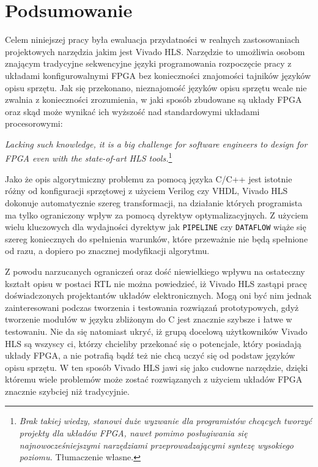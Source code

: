 \chapter*{Podsumowanie}

\pagestyle{empty}
\pagestyle{fancy}
\fancyhead{} %
\fancyhead[RO,LE]{\thepage}

Celem niniejszej pracy była ewaluacja przydatności w realnych zastosowaniach projektowych narzędzia jakim jest Vivado HLS. Narzędzie to umożliwia osobom znającym tradycyjne sekwencyjne języki programowania rozpoczęcie pracy z układami konfigurowalnymi FPGA bez konieczności znajomości tajników języków opisu sprzętu. Jak się przekonano, nieznajomość języków opisu sprzętu wcale nie zwalnia z konieczności zrozumienia, w jaki sposób zbudowane są układy FPGA oraz skąd może wynikać ich wyższość nad standardowymi układami procesorowymi:

\begin{displayquote}
\textit{Lacking such knowledge, it is a big challenge for software engineers to design for FPGA even with the state-of-art HLS tools.}\footnote{\textit{Brak takiej wiedzy, stanowi duże wyzwanie dla programistów chcących tworzyć projekty dla układów FPGA, nawet pomimo posługiwania się najnowocześniejszymi narzędziami przeprowadzającymi syntezę wysokiego poziomu.} Tłumaczenie własne.}\cite{FPGA_SD}
\end{displayquote}

Jako że opis algorytmiczny problemu za pomocą języka C/C++ jest istotnie różny od konfiguracji sprzętowej z użyciem Verilog czy VHDL, Vivado HLS dokonuje automatycznie szereg transformacji, na działanie których programista ma tylko ograniczony wpływ za pomocą dyrektyw optymalizacyjnych. Z użyciem wielu kluczowych dla wydajności dyrektyw jak \texttt{PIPELINE} czy \texttt{DATAFLOW} wiąże się szereg koniecznych do spełnienia warunków, które przeważnie nie będą spełnione od razu, a dopiero po znacznej modyfikacji algorytmu. 

Z powodu narzucanych ograniczeń oraz dość niewielkiego wpływu na ostateczny kształt opisu w postaci RTL nie można powiedzieć, iż Vivado HLS zastąpi pracę doświadczonych projektantów układów elektronicznych. Mogą oni być nim jednak zainteresowani podczas tworzenia i testowania rozwiązań prototypowych, gdyż tworzenie modułów w języku zbliżonym do C jest znacznie szybsze i łatwe w testowaniu. Nie da się natomiast ukryć, iż grupą docelową użytkowników Vivado HLS są wszyscy ci, którzy chcieliby przekonać się o potencjale, który posiadają układy FPGA, a nie potrafią bądź też nie chcą uczyć się od podstaw języków opisu sprzętu. W ten sposób Vivado HLS jawi się jako cudowne narzędzie, dzięki któremu wiele problemów może zostać rozwiązanych z użyciem układów FPGA znacznie szybciej niż tradycyjnie.

